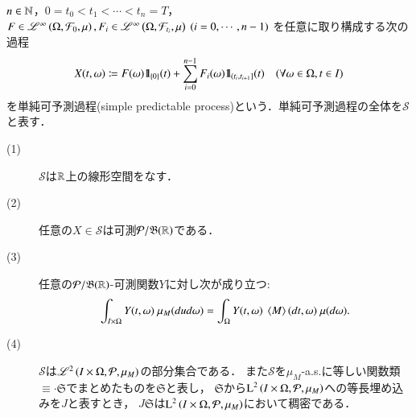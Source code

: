 	\begin{screen}
		\begin{dfn}[単純可予測過程]
			$n \in \mathbb{N}$，$0=t_0 < t_1 < \cdots < t_n = T$，
			$F \in \mathscr{L}^{\infty} \left(\Omega,\mathcal{F}_0,\mu\right),F_i \in \mathscr{L}^{\infty} \left(\Omega,\mathcal{F}_{t_i},\mu\right)\ (i=0,\cdots,n-1)$
			を任意に取り構成する次の過程
			\begin{align}
				X(t,\omega) \coloneqq F(\omega) \mbox{1}\hspace{-0.25em}\mbox{l}_{\{0\}} (t) + \sum_{i=0}^{n-1} F_i(\omega) \mbox{1}\hspace{-0.25em}\mbox{l}_{\left(t_i,t_{i+1}\right]}(t)
				\quad (\forall \omega \in \Omega,t \in I)
				\label{eq:dfn_simple_predictable_process}
			\end{align}
			を単純可予測過程(simple predictable process)という．単純可予測過程の全体を$\mathcal{S}$と表す．
			\label{dfn:predictable_simple_process}
		\end{dfn}
	\end{screen}
	
	\begin{screen}
		\begin{lem}[単純可予測過程の性質]\mbox{}
			\begin{description}
				\item[(1)] $\mathcal{S}$は$\mathbb{R}$上の線形空間をなす．
				\item[(2)] 任意の$X \in \mathcal{S}$は可測$\mathcal{P}/\mathfrak{B}(\mathbb{R})$である．
				\item[(3)] 任意の$\mathcal{P}/\mathfrak{B}(\mathbb{R})$-可測関数$Y$に対し次が成り立つ:
					\begin{align}
						\int_{I \times \Omega} Y(t,\omega)\ \mu_M(dud\omega)
						= \int_\Omega Y(t,\omega)\ \inprod<M>(dt,\omega)\ \mu(d\omega).
						\label{eq:lem_properties_of_simple_predictable_processes_0}
					\end{align}
				\item[(4)] $\mathcal{S}$は$\mathscr{L}^{2} \left(I \times \Omega,\mathcal{P},\mu_M\right)$の部分集合である．
					また$\mathcal{S}$を$\mu_M$-a.s.に等しい関数類$\equiv{\cdot}{\mathfrak{S}}$でまとめたものを$\mathfrak{S}$と表し，
					$\mathfrak{S}$から$\operatorname{L}^{2} \left(I \times \Omega,\mathcal{P},\mu_M\right)$への等長埋め込みを$J$と表すとき，
					$J\mathfrak{S}$は$\operatorname{L}^{2} \left(I \times \Omega,\mathcal{P},\mu_M\right)$において稠密である．
			\end{description}
			\label{lem:properties_of_simple_predictable_processes}
		\end{lem}
	\end{screen}
	
